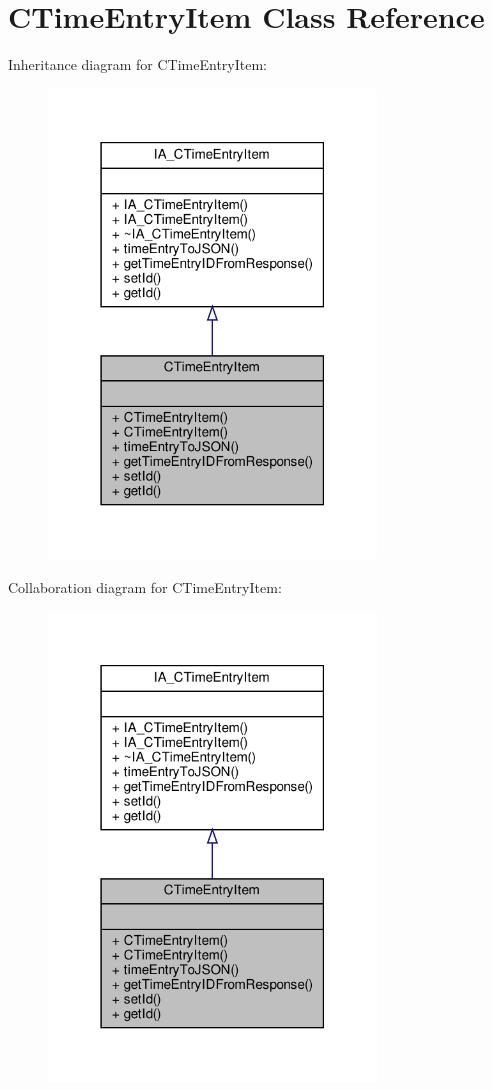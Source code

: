 \hypertarget{classCTimeEntryItem}{}\section{C\+Time\+Entry\+Item Class Reference}
\label{classCTimeEntryItem}


Inheritance diagram for C\+Time\+Entry\+Item\+:
\nopagebreak
\begin{figure}[H]
\begin{center}
\leavevmode
\includegraphics[width=247pt]{classCTimeEntryItem__inherit__graph}
\end{center}
\end{figure}


Collaboration diagram for C\+Time\+Entry\+Item\+:
\nopagebreak
\begin{figure}[H]
\begin{center}
\leavevmode
\includegraphics[width=247pt]{classCTimeEntryItem__coll__graph}
\end{center}
\end{figure}
